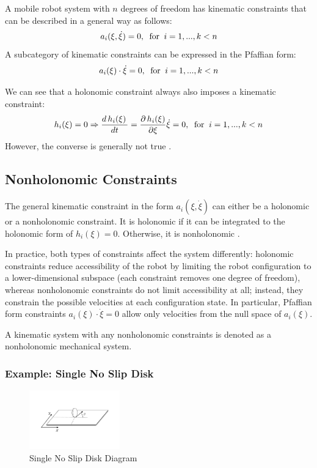 \documentclass[twoside]{article}
\begin{document}
\newpage

\begin{frm-def}
A mobile robot system with $n$ degrees of freedom has kinematic constraints that can be described in a general way as follows: 
$$  
a_i (\xi, \dot{\xi})=0,\;\;\textup{for}\;\;i = 1,...,k < n
$$
A subcategory of kinematic constraints can be expressed in the Pfaffian form:
$$
a_i(\xi) \cdot \dot{\xi} = 0,\;\;\textup{for}\;\;i = 1,...,k < n
$$
\end{frm-def}

We can see that a holonomic constraint always also imposes a kinematic constraint:
$$
h_i(\xi) = 0 \Rightarrow \frac{d\,h_i(\xi)\, }{dt} = \frac{\partial\,h_i(\xi)}{\partial \xi} \dot{\xi} = 0,\;\;\textup{for}\;\;i = 1,...,k < n
$$
However, the converse is generally not true \cite{ssvo}. 

\subsection*{Nonholonomic Constraints}

The general kinematic constraint in the form $ a_i (\xi, \dot{\xi}) $ can either be a holonomic or a nonholonomic constraint. It is holonomic if it can be integrated to the holonomic form of $ h_i(\xi) = 0 $. Otherwise, it is nonholonomic \cite{ssvo}. 

In practice, both types of constraints affect the system differently: holonomic constraints reduce accessibility of the robot by limiting the robot configuration to a lower-dimensional subspace (each constraint removes one degree of freedom), whereas nonholonomic constraints do not limit accessibility at all; instead, they constrain the possible velocities at each configuration state. In particular, Pfaffian form constraints $ a_i(\xi) \cdot \dot{\xi} = 0 $ allow only velocities from the null space of $ a_i (\xi) $.

A kinematic system with any nonholonomic constraints is denoted as a nonholonomic mechanical system.

\subsubsection*{Example: Single No Slip Disk \cite{ssvo}}

\begin{figure}[H]
\centering
\includegraphics[width=0.35\textwidth]{Slip_Disk_Example}
\caption{Single No Slip Disk Diagram}
\end{figure}
\end{document}
